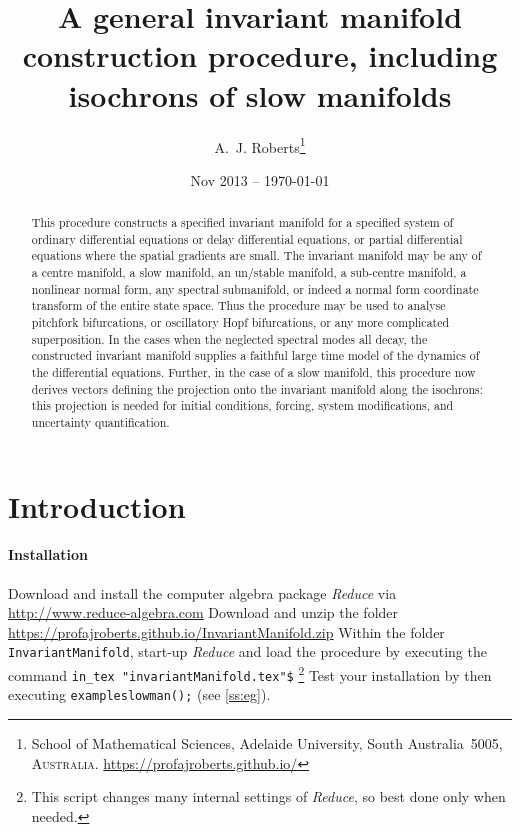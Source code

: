 \documentclass[11pt,a5paper]{article}
\title{A general invariant manifold construction procedure,
including isochrons of slow manifolds}
\author{A.~J. Roberts\thanks{School of Mathematical
Sciences, Adelaide University, South Australia~5005,
\textsc{Australia}. \url{https://profajroberts.github.io/}}}
\date{Nov 2013 -- \today}
\begin{document}
\sloppy

\maketitle

\begin{abstract}
This procedure constructs a specified invariant manifold for
a specified system of ordinary differential equations or
delay differential equations, or partial differential
equations where the spatial gradients are small. The
invariant manifold may be any of a centre manifold, a slow
manifold, an un/stable manifold, a sub-centre manifold, a
nonlinear normal form, any spectral submanifold, or indeed a
normal form coordinate transform of the entire state space.
Thus the procedure may be used to analyse pitchfork
bifurcations, or oscillatory Hopf bifurcations, or any more
complicated superposition. In the cases when the neglected
spectral modes all decay, the constructed invariant manifold
supplies a faithful large time model of the dynamics of the
differential equations. Further, in the case of a slow
manifold, this procedure now derives vectors defining the
projection onto the invariant manifold along the isochrons:
this projection is needed for initial conditions, forcing,
system modifications, and uncertainty quantification.
\end{abstract}

\tableofcontents



\section{Introduction}
\localtableofcontents

\paragraph{Installation}
Download and install the computer algebra package
\emph{Reduce} via \url{http://www.reduce-algebra.com}\quad
Download and unzip the folder
\url{https://profajroberts.github.io/InvariantManifold.zip}
\quad Within the folder \verb|InvariantManifold|, start-up
\emph{Reduce} and load the procedure by executing the
command \verb|in_tex "invariantManifold.tex"$|
\footnote{This script changes many internal settings of
\emph{Reduce}, so best done only when needed.} Test your
installation by then executing \verb|exampleslowman();|
\quad(see \cref{ss:eg}).
\end{document}

